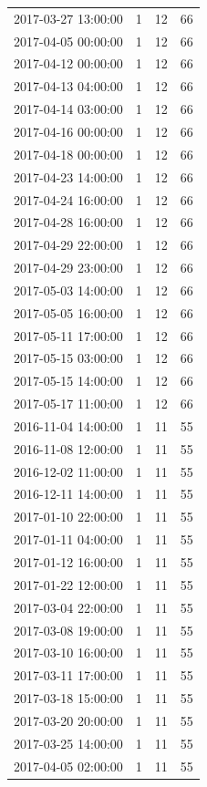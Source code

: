 \begin{tabular}{lrrr}
2017-03-27 13:00:00 & 1 & 12 & 66 \\
2017-04-05 00:00:00 & 1 & 12 & 66 \\
2017-04-12 00:00:00 & 1 & 12 & 66 \\
2017-04-13 04:00:00 & 1 & 12 & 66 \\
2017-04-14 03:00:00 & 1 & 12 & 66 \\
2017-04-16 00:00:00 & 1 & 12 & 66 \\
2017-04-18 00:00:00 & 1 & 12 & 66 \\
2017-04-23 14:00:00 & 1 & 12 & 66 \\
2017-04-24 16:00:00 & 1 & 12 & 66 \\
2017-04-28 16:00:00 & 1 & 12 & 66 \\
2017-04-29 22:00:00 & 1 & 12 & 66 \\
2017-04-29 23:00:00 & 1 & 12 & 66 \\
2017-05-03 14:00:00 & 1 & 12 & 66 \\
2017-05-05 16:00:00 & 1 & 12 & 66 \\
2017-05-11 17:00:00 & 1 & 12 & 66 \\
2017-05-15 03:00:00 & 1 & 12 & 66 \\
2017-05-15 14:00:00 & 1 & 12 & 66 \\
2017-05-17 11:00:00 & 1 & 12 & 66 \\
2016-11-04 14:00:00 & 1 & 11 & 55 \\
2016-11-08 12:00:00 & 1 & 11 & 55 \\
2016-12-02 11:00:00 & 1 & 11 & 55 \\
2016-12-11 14:00:00 & 1 & 11 & 55 \\
2017-01-10 22:00:00 & 1 & 11 & 55 \\
2017-01-11 04:00:00 & 1 & 11 & 55 \\
2017-01-12 16:00:00 & 1 & 11 & 55 \\
2017-01-22 12:00:00 & 1 & 11 & 55 \\
2017-03-04 22:00:00 & 1 & 11 & 55 \\
2017-03-08 19:00:00 & 1 & 11 & 55 \\
2017-03-10 16:00:00 & 1 & 11 & 55 \\
2017-03-11 17:00:00 & 1 & 11 & 55 \\
2017-03-18 15:00:00 & 1 & 11 & 55 \\
2017-03-20 20:00:00 & 1 & 11 & 55 \\
2017-03-25 14:00:00 & 1 & 11 & 55 \\
2017-04-05 02:00:00 & 1 & 11 & 55 \\

\end{tabular}
